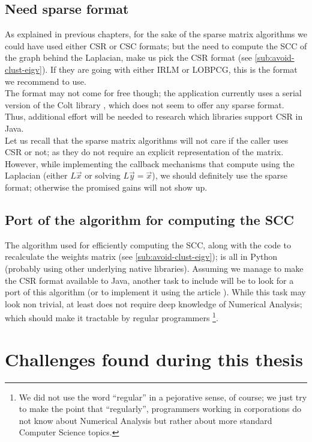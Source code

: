 \subsection{Need sparse format}

As explained in previous chapters, for the sake of the sparse matrix
algorithms we 
could have used either CSR or CSC formats; but the need to compute the
\gls{SCC} of the graph behind the \gls{Laplacian}, make us pick the CSR
format (see \cref{sub:avoid-clust-eigv}). If they are going with
either \gls{IRLM} or \gls{LOBPCG}, this is the format we recommend to use. \\

The format may not come for free though; the application currently
uses a serial version of the Colt library \cite{colt}, which does not
seem to offer any sparse format. Thus, additional effort will be
needed to research which libraries support CSR in Java. \\

Let us recall that the sparse matrix algorithms will not care if the caller uses
CSR or not; as they do not require an explicit representation of the
matrix. However, while implementing the callback mechanisms that 
compute using the \gls{Laplacian} (either $L\vec{x}$ or solving $L\vec{y} =
\vec{x}$), we should definitely use the sparse format; otherwise the
promised gains will not show up.

\subsection{Port of the algorithm for computing the \gls{SCC}}

The algorithm used for efficiently computing the \gls{SCC}, along with the
code to recalculate the weights matrix (see
\cref{sub:avoid-clust-eigv}); is all in Python (probably 
using other underlying native libraries). Assuming we manage to make the CSR
format available to Java, another task to include will be to look for
a port of this algorithm (or to implement it using the article
\cite{pearce05}). While this task may look non trivial, at least does
not require deep knowledge of Numerical Analysis; which should make it
tractable by regular programmers \footnote{We did not use the
word ``regular'' in a pejorative sense, of course; we just try to make
the point that ``regularly'', programmers working in corporations do
not know about Numerical Analysis but rather about more standard
Computer Science topics.}.

\section{Challenges found during this thesis}

